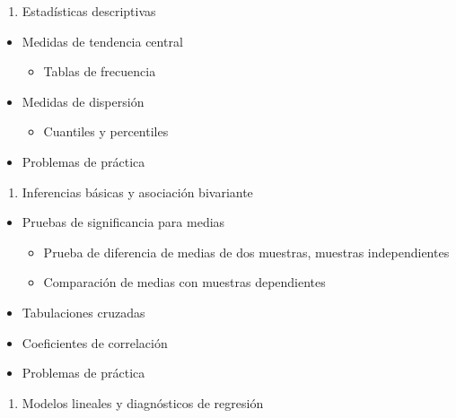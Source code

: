 \documentclass[
]{book}
\providecommand{\tightlist}{%
  \setlength{\itemsep}{0pt}\setlength{\parskip}{0pt}}
\begin{document}
\begin{enumerate}
\def\labelenumi{\arabic{enumi}.}
\setcounter{enumi}{3}
\tightlist
\item
  Estadísticas descriptivas
\end{enumerate}

\begin{itemize}
\tightlist
\item
  Medidas de tendencia central

  \begin{itemize}
  \tightlist
  \item
    Tablas de frecuencia
  \end{itemize}
\item
  Medidas de dispersión

  \begin{itemize}
  \tightlist
  \item
    Cuantiles y percentiles
  \end{itemize}
\item
  Problemas de práctica
\end{itemize}

\begin{enumerate}
\def\labelenumi{\arabic{enumi}.}
\setcounter{enumi}{4}
\tightlist
\item
  Inferencias básicas y asociación bivariante
\end{enumerate}

\begin{itemize}
\tightlist
\item
  Pruebas de significancia para medias

  \begin{itemize}
  \tightlist
  \item
    Prueba de diferencia de medias de dos muestras, muestras independientes
  \item
    Comparación de medias con muestras dependientes
  \end{itemize}
\item
  Tabulaciones cruzadas
\item
  Coeficientes de correlación
\item
  Problemas de práctica
\end{itemize}

\begin{enumerate}
\def\labelenumi{\arabic{enumi}.}
\setcounter{enumi}{5}
\tightlist
\item
  Modelos lineales y diagnósticos de regresión
\end{enumerate}
\end{document}
